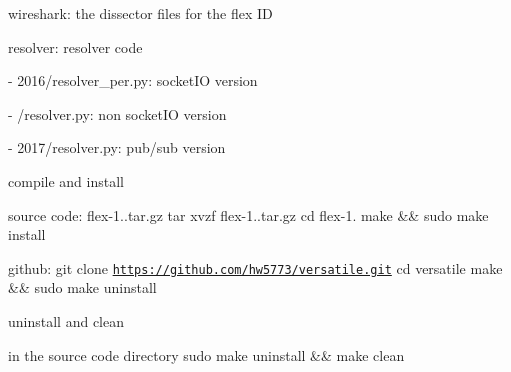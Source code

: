 wireshark\+: the dissector files for the flex ID

resolver\+: resolver code \begin{DoxyVerb}- 2016/resolver_per.py: socketIO version

-     /resolver.py: non socketIO version

- 2017/resolver.py: pub/sub version
\end{DoxyVerb}


compile and install
\begin{DoxyItemize}
\item source code\+: flex-\/1..\+tar.\+gz tar xvzf flex-\/1..\+tar.\+gz cd flex-\/1. make \&\& sudo make install
\item github\+: git clone \href{https://github.com/hw5773/versatile.git}{\tt https\+://github.\+com/hw5773/versatile.\+git} cd versatile make \&\& sudo make uninstall
\end{DoxyItemize}

uninstall and clean
\begin{DoxyItemize}
\item in the source code directory sudo make uninstall \&\& make clean 
\end{DoxyItemize}